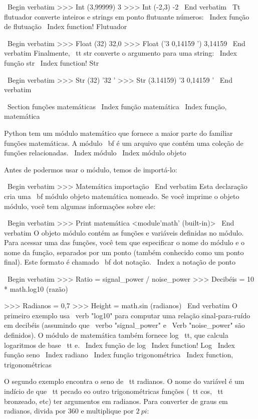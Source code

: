 \documentclass[10pt]{book}
\begin{document}
\begin {itemize}
{\ Begin {verbatim}
>>> Int (3,99999)
3
>>> Int (-2,3)
-2
\ End {verbatim}
%
{\ Tt flutuador} converte inteiros e strings em ponto flutuante
números:
\ Index {função de flutuação}
\ Index {function! Flutuador}

\ Begin {verbatim}
>>> Float (32)
32,0
>>> Float ('3 0,14159 ')
3,14159
\ End {verbatim}
%
Finalmente, {\ tt str} converte o argumento para uma string:
\ Index {função str}
\ Index {function! Str}

\ Begin {verbatim}
>>> Str (32)
'32 '
>>> Str (3.14159)
'3 0,14159 '
\ End {verbatim}
%



\ Section {funções matemáticas}
\ Index {função matemática}
\ Index {função, matemática}

Python tem um módulo matemático que fornece a maior parte do familiar
funções matemáticas. A {módulo \ bf} é um arquivo que contém uma
coleção de funções relacionadas.
\ Index {módulo}
\ Index {módulo objeto}

Antes de podermos usar o módulo, temos de importá-lo:

\ Begin {verbatim}
>>> Matemática importação
\ End {verbatim}
%
Esta declaração cria uma {\ bf módulo objeto} matemática nomeado. Se
você imprime o objeto módulo, você tem algumas informações sobre ele:

\ Begin {verbatim}
>>> Print matemática
<module'math' (built-in)>
\ End {verbatim}
%
O objeto módulo contém as funções e variáveis ​​definidas no
módulo. Para acessar uma das funções, você tem que especificar o nome
do módulo e o nome da função, separados por um ponto (também
conhecido como um ponto final). Este formato é chamado {\ bf dot notação}.
\ Index {} a notação de ponto

\ Begin {verbatim}
>>> Ratio = signal_power / noise_power
>>> Decibéis = 10 * math.log10 (razão)

>>> Radianos = 0,7
>>> Height = math.sin (radianos)
\ End {verbatim}
%
O primeiro exemplo usa \ verb "log10" para computar 
uma relação sinal-para-ruído em decibéis (assumindo que \ verbo "signal_power" e
\ Verb "noise_power" são definidos). O módulo de matemática também fornece {log \ tt},
que calcula logaritmos de base {\ tt e}.
\ Index {função de log}
\ Index {function! Log}
\ Index {função seno}
\ Index {} radiano
\ Index {função trigonométrica}
\ Index {function, trigonométricas}

O segundo exemplo encontra o seno de {\ tt radianos}. O nome do
variável é um indício de que {\ tt pecado} eo outro trigonométricas
funções ({\ tt cos}, {\ tt bronzeado}, etc) ter argumentos em radianos. Para
converter de graus em radianos, divida por 360 e multiplique por
$ 2 \ pi $:

}
\end{itemize}
\end{document}
